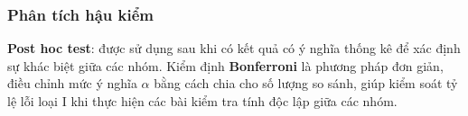 \subsubsection{Phân tích hậu kiểm}
\textbf{Post hoc test}: được sử dụng sau khi có kết quả có ý nghĩa thống kê để xác định sự khác biệt giữa các nhóm. Kiểm định \textbf{Bonferroni} là phương pháp đơn giản, điều chỉnh mức ý nghĩa \(\alpha\) bằng cách chia cho số lượng so sánh, giúp kiểm soát tỷ lệ lỗi loại I khi thực hiện các bài kiểm tra tính độc lập giữa các nhóm.

